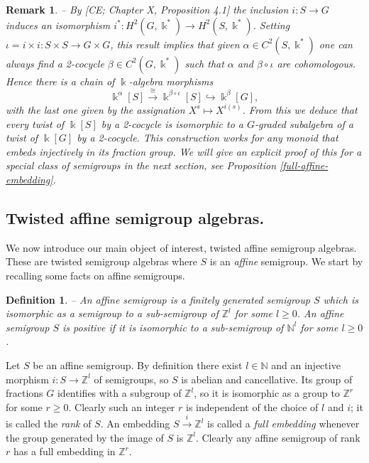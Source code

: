 \documentclass[twoside,11pt]{article}
\renewcommand{\k}{\Bbbk}
\newcommand{\N}{{\mathbb N}}
\newcommand{\Z}{{\mathbb Z}}
\newtheorem{subdefinition}[subtheorem]{Definition}
\newtheorem{subremark}[subtheorem]{Remark}
\begin{document}
\begin{subremark} -- \rm \label{semigroup-versus-group}
By [CE; Chapter X, Proposition 4.1] the inclusion $i : S \to G$ induces an isomorphism
$i^*: H^2(G,\k^*) \to H^2(S,\k^*)$. Setting $\iota = i \times i : S \times S \to G
\times G$, this result implies that given $\alpha \in C^2(S,\k^*)$ one can always find
a 2-cocycle $\beta \in C^2(G,\k^*)$ such that $\alpha$ and $\beta \circ \iota$ are
cohomologous. Hence there is a chain of $\k$-algebra morphisms
  \[
    \k^\alpha[S] \stackrel{\cong}{\to} \k^{\beta \circ \iota}[S] \hookrightarrow
    \k^\beta[G],
  \]
with the last one given by the assignation $X^s \mapsto X^{i(s)}$. From this we deduce
that every twist of $\k[S]$ by a 2-cocycle is isomorphic to a $G$-graded subalgebra of a
twist of $\k[G]$ by a 2-cocycle. This construction works for any monoid that
embeds injectively in its fraction group. We will give an explicit proof of this for
a special class of semigroups in the next section, see Proposition
\ref{full-affine-embedding}.
\end{subremark}

\subsection{Twisted affine semigroup algebras.} \label{ss-tasa}
We now introduce our main object of interest, twisted affine semigroup algebras. These are
twisted semigroup algebras where $S$ is an \emph{affine} semigroup. We start by recalling
some facts on affine semigroups.

\begin{subdefinition} -- An \emph{affine semigroup} is a finitely generated semigroup $S$
	which is isomorphic as a semigroup to a sub-semigroup of $\Z^l$ for some $l \geq
	0$. An affine semigroup $S$ is \emph{positive} if it is isomorphic to a
	sub-semigroup of $\N^l$ for some $l \geq 0$.
\end{subdefinition}

Let $S$ be an affine semigroup. By definition there exist $l\in\N$ and an injective
morphism $i: S \longrightarrow \Z^l$ of semigroups, so $S$ is abelian and cancellative.
Its group of fractions $G$ identifies with a subgroup of $\Z^l$, so it is isomorphic as a
group to $\Z^r$ for some $r \geq 0$.  Clearly such an integer $r$ is independent of the
choice of $l$ and $i$; it is called the \emph{rank} of $S$. An embedding $S
\stackrel{i}{\longrightarrow} \Z^l$ is called a \emph{full embedding} whenever the group
generated by the image of $S$ is $\Z^l$. Clearly any affine semigroup of rank $r$ has a
full embedding in $\Z^r$.
\end{document}
